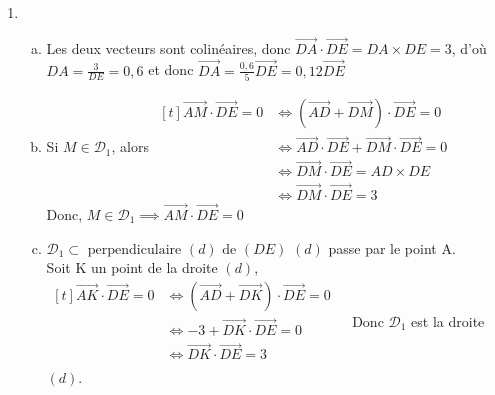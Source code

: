 \documentclass[12pt, a4paper]{article}
\begin{document}
\begin{Exercise}[number={121}]
    \begin{enumerate}[1)]
        \item	\begin{enumerate}[a)]
                    \item	Les deux vecteurs sont colinéaires, donc $\overrightarrow{DA}\cdot\overrightarrow{DE}=DA\times DE=3$, d'où $DA=\frac{3}{DE}=0{,}6$ et donc $\overrightarrow{DA}=\frac{0{,}6}{5}\overrightarrow{DE}=0{,}12\overrightarrow{DE}$ 
                    \item   Si $M\in\mathcal{D}_1$, \quad alors \quad   $\begin{aligned}[t]
                                                                            \overrightarrow{AM}\cdot\overrightarrow{DE}=0&\iff\left(\overrightarrow{AD}+\overrightarrow{DM}\right)\cdot\overrightarrow{DE}=0 &\\
                                                                            &\iff\overrightarrow{AD}\cdot\overrightarrow{DE}+\overrightarrow{DM}\cdot\overrightarrow{DE}=0 &\\
                                                                            &\iff\overrightarrow{DM}\cdot\overrightarrow{DE}=AD\times DE &\\
                                                                            &\iff\overrightarrow{DM}\cdot\overrightarrow{DE}=3
                                                                    \end{aligned}$ \medbreak Donc, $M\in\mathcal{D}_1\implies\overrightarrow{AM}\cdot\overrightarrow{DE}=0$
                    \item   $\mathcal{D}_1\subset\text{\ perpendiculaire\ }(d)\text{\ de\ }(DE)$ \quad $(d)$ passe par le point A. \\ Soit K un point de la droite $(d)$, \\ 
                    $\begin{aligned}[t]
                        \overrightarrow{AK}\cdot\overrightarrow{DE}=0&\iff\left(\overrightarrow{AD}+\overrightarrow{DK}\right)\cdot\overrightarrow{DE}=0 &\\
                        &\iff -3+\overrightarrow{DK}\cdot\overrightarrow{DE}=0 &\\
                        &\iff\overrightarrow{DK}\cdot\overrightarrow{DE}=3 &\\
                    \end{aligned}$ \medbreak Donc $\mathcal{D}_1$ est la droite $(d)$.

\end{enumerate}
\end{enumerate}
\end{Exercise}
\end{document}
